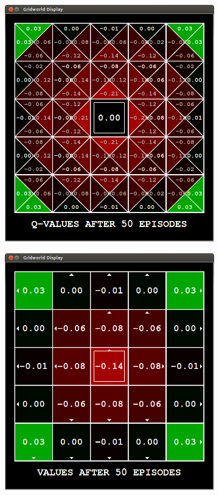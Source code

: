 \documentclass[11pt]{article}
\begin{document}
\begin{figure}[h]
\centering
\begin{subfigure}{0.49\textwidth}
	\includegraphics[width=\textwidth]{figure/obstacle}
\end{subfigure}
\begin{subfigure}{0.49\textwidth}
	\includegraphics[width=\textwidth]{figure/obstacle_policy}
\end{subfigure}
\label{fig:rep}
\end{figure}
\end{document}
